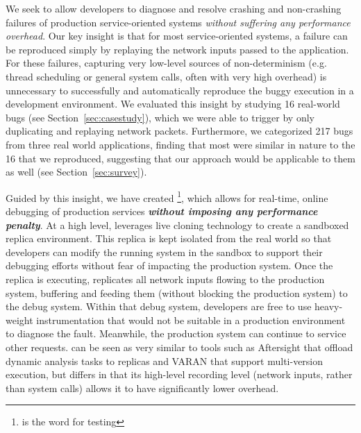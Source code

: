 We seek to allow developers to diagnose and resolve crashing and non-crashing failures of production service-oriented systems \emph{without suffering any performance overhead}.
Our key insight is that for most service-oriented systems, a failure can be reproduced simply by replaying the network inputs passed to the application.
For these failures, capturing very low-level sources of non-determinism (e.g. thread scheduling or general system calls, often with very high overhead) is unnecessary to successfully and automatically reproduce the buggy execution in a development environment.
We evaluated this insight by studying 16 real-world bugs (see Section~\ref{sec:casestudy}), which we were able to trigger by only duplicating and replaying network packets.
Furthermore, we categorized 217 bugs from three real world applications, finding that most were similar in nature to the 16 that we reproduced, suggesting that our approach would be applicable to them as well (see Section~\ref{sec:survey}).


Guided by this insight, we have created \parikshan\footnote{\parikshan is the \toolNameLang word for  testing}, which allows for real-time, online debugging of production services \textbf{\emph{without imposing any performance penalty}}.
At a high level, \parikshan leverages live cloning technology to create a sandboxed replica environment.
This replica is kept isolated from the real world so that developers can modify the running system in the sandbox to support their debugging efforts without fear of impacting the production system.
Once the replica is executing, \parikshan replicates all network inputs flowing to the production system, buffering and feeding them (without blocking the production system) to the debug system.
Within that debug system, developers are free to use heavy-weight instrumentation that would not be suitable in a production environment to diagnose the fault.
Meanwhile, the production system can continue to service other requests.
\parikshan can be seen as very similar to tools such as Aftersight \cite{aftersight} that offload dynamic analysis tasks to replicas and VARAN \cite{Hosek:2015:VUE:2694344.2694390} that support multi-version execution, but differs in that its high-level recording level (network inputs, rather than system calls) allows it to have significantly lower overhead.


